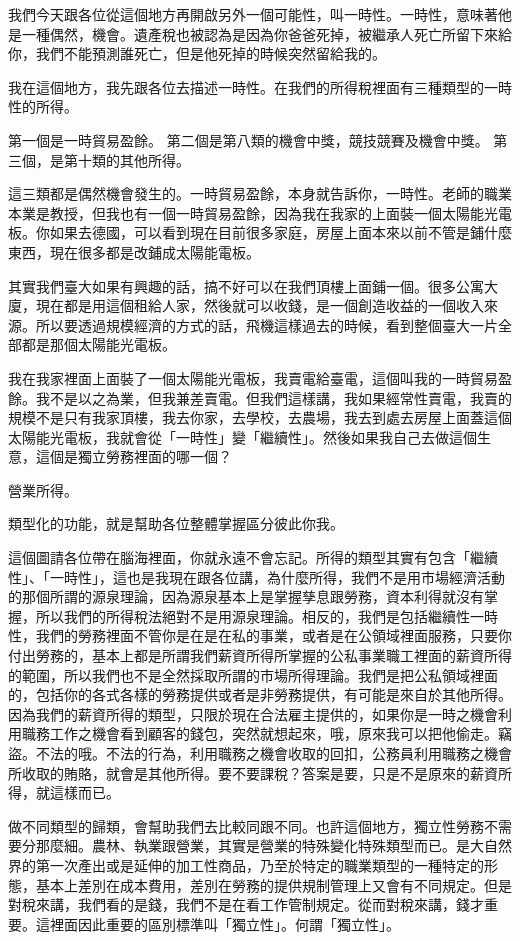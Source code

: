 \documentclass[]{ctexbook}
\begin{document}
我們今天跟各位從這個地方再開啟另外一個可能性，叫一時性。一時性，意味著他是一種偶然，機會。遺產稅也被認為是因為你爸爸死掉，被繼承人死亡所留下來給你，我們不能預測誰死亡，但是他死掉的時候突然留給我的。

我在這個地方，我先跟各位去描述一時性。在我們的所得稅裡面有三種類型的一時性的所得。

第一個是一時貿易盈餘。
第二個是第八類的機會中獎，競技競賽及機會中獎。
第三個，是第十類的其他所得。

這三類都是偶然機會發生的。一時貿易盈餘，本身就告訴你，一時性。老師的職業本業是教授，但我也有一個一時貿易盈餘，因為我在我家的上面裝一個太陽能光電板。你如果去德國，可以看到現在目前很多家庭，房屋上面本來以前不管是鋪什麼東西，現在很多都是改鋪成太陽能電板。

其實我們臺大如果有興趣的話，搞不好可以在我們頂樓上面鋪一個。很多公寓大廈，現在都是用這個租給人家，然後就可以收錢，是一個創造收益的一個收入來源。所以要透過規模經濟的方式的話，飛機這樣過去的時候，看到整個臺大一片全部都是那個太陽能光電板。

我在我家裡面上面裝了一個太陽能光電板，我賣電給臺電，這個叫我的一時貿易盈餘。我不是以之為業，但我兼差賣電。但我們這樣講，我如果經常性賣電，我賣的規模不是只有我家頂樓，我去你家，去學校，去農場，我去到處去房屋上面蓋這個太陽能光電板，我就會從「一時性」變「繼續性」。然後如果我自己去做這個生意，這個是獨立勞務裡面的哪一個？

營業所得。

類型化的功能，就是幫助各位整體掌握區分彼此你我。

這個圖請各位帶在腦海裡面，你就永遠不會忘記。所得的類型其實有包含「繼續性」、「一時性」，這也是我現在跟各位講，為什麼所得，我們不是用市場經濟活動的那個所謂的源泉理論，因為源泉基本上是掌握孳息跟勞務，資本利得就沒有掌握，所以我們的所得稅法絕對不是用源泉理論。相反的，我們是包括繼續性一時性，我們的勞務裡面不管你是在是在私的事業，或者是在公領域裡面服務，只要你付出勞務的，基本上都是所謂我們薪資所得所掌握的公私事業職工裡面的薪資所得的範圍，所以我們也不是全然採取所謂的市場所得理論。我們是把公私領域裡面的，包括你的各式各樣的勞務提供或者是非勞務提供，有可能是來自於其他所得。因為我們的薪資所得的類型，只限於現在合法雇主提供的，如果你是一時之機會利用職務工作之機會看到顧客的錢包，突然就想起來，哦，原來我可以把他偷走。竊盜。不法的哦。不法的行為，利用職務之機會收取的回扣，公務員利用職務之機會所收取的賄賂，就會是其他所得。要不要課稅？答案是要，只是不是原來的薪資所得，就這樣而已。

做不同類型的歸類，會幫助我們去比較同跟不同。也許這個地方，獨立性勞務不需要分那麼細。農林、執業跟營業，其實是營業的特殊變化特殊類型而已。是大自然界的第一次產出或是延伸的加工性商品，乃至於特定的職業類型的一種特定的形態，基本上差別在成本費用，差別在勞務的提供規制管理上又會有不同規定。但是對稅來講，我們看的是錢，我們不是在看工作管制規定。從而對稅來講，錢才重要。這裡面因此重要的區別標準叫「獨立性」。何謂「獨立性」。
\end{document}
